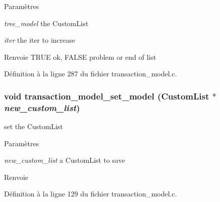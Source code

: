 \begin{DoxyParams}{Paramètres}
\item[{\em tree\_\-model}]the CustomList \item[{\em iter}]the iter to increase\end{DoxyParams}
\begin{DoxyReturn}{Renvoie}
TRUE ok, FALSE problem or end of list 
\end{DoxyReturn}


Définition à la ligne 287 du fichier transaction\_\-model.c.

\subsubsection[{transaction\_\-model\_\-set\_\-model}]{\setlength{\rightskip}{0pt plus 5cm}void transaction\_\-model\_\-set\_\-model ({\bf CustomList} $\ast$ {\em new\_\-custom\_\-list})}\label{transaction__model_8h_abdb06cefc313c26f54d556ad09f71302}
set the CustomList


\begin{DoxyParams}{Paramètres}
\item[{\em new\_\-custom\_\-list}]a CustomList to save\end{DoxyParams}
\begin{DoxyReturn}{Renvoie}

\end{DoxyReturn}


Définition à la ligne 129 du fichier transaction\_\-model.c.

